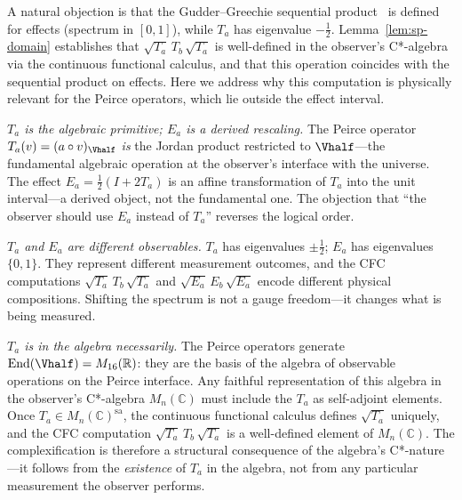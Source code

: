 \begin{remark}
\label{rem:sp-domain}
A natural objection is that the Gudder--Greechie sequential
product~\cite{GudderGreechie2002} is defined for effects (spectrum
in $[0,1]$), while $T_a$ has eigenvalue $-\tfrac{1}{2}$.
Lemma~\ref{lem:sp-domain} establishes that
$\sqrt{T_a}\,T_b\,\sqrt{T_a}$ is well-defined in the observer's
C*-algebra via the continuous functional calculus, and that this
operation coincides with the sequential product on effects.
Here we address why this computation is physically relevant for
the Peirce operators, which lie outside the effect interval.

\emph{$T_a$ is the algebraic primitive; $E_a$ is a derived
rescaling.}\enspace
The Peirce operator $T_a(v) = (a\circ v)_{\Vhalf}$ \emph{is} the
Jordan product restricted to $\Vhalf$---the fundamental algebraic
operation at the observer's interface with the universe.
The effect $E_a = \tfrac{1}{2}(I + 2T_a)$ is an affine
transformation of $T_a$ into the unit interval---a derived object,
not the fundamental one.  The objection that ``the observer should
use $E_a$ instead of $T_a$'' reverses the logical order.

\emph{$T_a$ and $E_a$ are different observables.}\enspace
$T_a$ has eigenvalues $\pm\tfrac{1}{2}$; $E_a$ has eigenvalues
$\{0,1\}$.  They represent different measurement outcomes, and the
CFC computations $\sqrt{T_a}\,T_b\,\sqrt{T_a}$ and
$\sqrt{E_a}\,E_b\,\sqrt{E_a}$ encode different physical
compositions.  Shifting the spectrum is not a gauge freedom---it
changes what is being measured.

\emph{$T_a$ is in the algebra necessarily.}\enspace
The Peirce operators generate
$\mathrm{End}(\Vhalf) = M_{16}(\mathbb{R})$: they are the
basis of the algebra of observable operations on the Peirce
interface.  Any faithful representation of this algebra in the
observer's C*-algebra $M_n(\mathbb{C})$ must include the $T_a$
as self-adjoint elements.  Once
$T_a \in M_n(\mathbb{C})^{\mathrm{sa}}$, the continuous
functional calculus defines $\sqrt{T_a}$ uniquely, and the
CFC computation $\sqrt{T_a}\,T_b\,\sqrt{T_a}$ is a
well-defined element of $M_n(\mathbb{C})$.  The complexification
is therefore a structural consequence of the algebra's
C*-nature---it follows from the \emph{existence} of $T_a$ in
the algebra, not from any particular measurement the observer
performs.
\end{remark}

